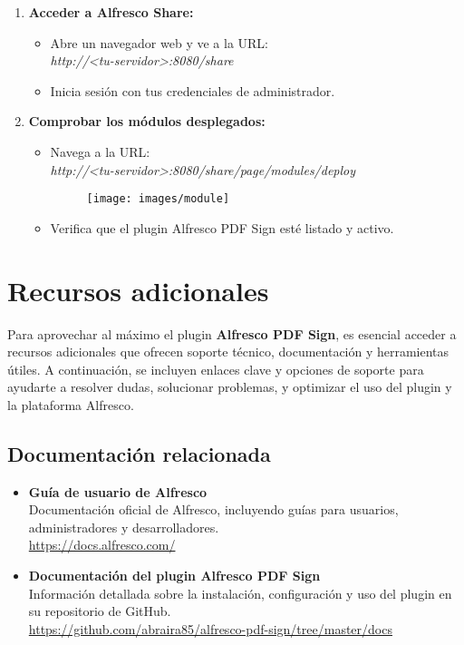 \documentclass{template/ol-softwaremanual}
\begin{document}
\begin{enumerate}
	\item \textbf{Acceder a Alfresco Share:}
	\begin{itemize}
	 	\item Abre un navegador web y ve a la URL: \\ \textit{http://<tu-servidor>:8080/share}
	 	\item Inicia sesión con tus credenciales de administrador.
	\end{itemize}
	\item \textbf{Comprobar los módulos desplegados:}
	\begin{itemize}
		\item Navega a la URL: \\ \textit{http://<tu-servidor>:8080/share/page/modules/deploy}
		\begin{figure}[h]
			\centering
			\texttt{[image: images/module]}
			\label{fig:etiqueta_imagen}
		\end{figure}
		\item Verifica que el plugin Alfresco PDF Sign esté listado y activo.
	\end{itemize}
\end{enumerate}

\section{Recursos adicionales}

Para aprovechar al máximo el plugin \textbf{Alfresco PDF Sign}, es esencial acceder a recursos adicionales que ofrecen soporte técnico, documentación y herramientas útiles. A continuación, se incluyen enlaces clave y opciones de soporte para ayudarte a resolver dudas, solucionar problemas, y optimizar el uso del plugin y la plataforma Alfresco.

\subsection{Documentación relacionada}

\begin{itemize}
	\item \textbf{Guía de usuario de Alfresco}\\
	Documentación oficial de Alfresco, incluyendo guías para usuarios, administradores y desarrolladores.\\
	\url{https://docs.alfresco.com/}

	\item \textbf{Documentación del plugin Alfresco PDF Sign}\\
	Información detallada sobre la instalación, configuración y uso del plugin en su repositorio de GitHub.\\
	\url{https://github.com/abraira85/alfresco-pdf-sign/tree/master/docs}
\end{itemize}
\end{document}
